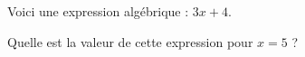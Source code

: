 
Voici une expression algébrique : $3x+4$.

Quelle est la valeur de cette expression pour $x=5$ ?

\smallskip
{}
